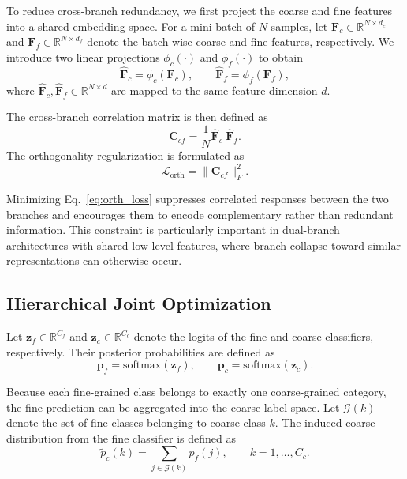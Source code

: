 \documentclass[pdflatex,sn-mathphys-num]{sn-jnl}
\theoremstyle{thmstyleone}%
\theoremstyle{thmstyletwo}%
\theoremstyle{thmstylethree}%
\begin{document}
To reduce cross-branch redundancy, we first project the coarse and fine features into a shared embedding space. 
For a mini-batch of $N$ samples, let $\mathbf{F}_c \in \mathbb{R}^{N \times d_c}$ and $\mathbf{F}_f \in \mathbb{R}^{N \times d_f}$ denote the batch-wise coarse and fine features, respectively. 
We introduce two linear projections $\phi_c(\cdot)$ and $\phi_f(\cdot)$ to obtain
\begin{equation}
\hat{\mathbf{F}}_c = \phi_c(\mathbf{F}_c), \qquad
\hat{\mathbf{F}}_f = \phi_f(\mathbf{F}_f),
\end{equation}
where $\hat{\mathbf{F}}_c, \hat{\mathbf{F}}_f \in \mathbb{R}^{N \times d}$ are mapped to the same feature dimension $d$.

The cross-branch correlation matrix is then defined as
\begin{equation}
\mathbf{C}_{cf} = \frac{1}{N}\hat{\mathbf{F}}_c^\top \hat{\mathbf{F}}_f.
\end{equation}
The orthogonality regularization is formulated as
\begin{equation}
\mathcal{L}_{\text{orth}} = \|\mathbf{C}_{cf}\|_F^2.
\label{eq:orth_loss}
\end{equation}

Minimizing Eq.~\eqref{eq:orth_loss} suppresses correlated responses between the two branches and encourages them to encode complementary rather than redundant information. 
This constraint is particularly important in dual-branch architectures with shared low-level features, where branch collapse toward similar representations can otherwise occur.

\subsection{Hierarchical Joint Optimization}

Let $\mathbf{z}_f \in \mathbb{R}^{C_f}$ and $\mathbf{z}_c \in \mathbb{R}^{C_c}$ denote the logits of the fine and coarse classifiers, respectively. 
Their posterior probabilities are defined as
\begin{equation}
\mathbf{p}_f = \mathrm{softmax}(\mathbf{z}_f), \qquad
\mathbf{p}_c = \mathrm{softmax}(\mathbf{z}_c).
\end{equation}

Because each fine-grained class belongs to exactly one coarse-grained category, the fine prediction can be aggregated into the coarse label space. 
Let $\mathcal{G}(k)$ denote the set of fine classes belonging to coarse class $k$. 
The induced coarse distribution from the fine classifier is defined as
\begin{equation}
\tilde{p}_c(k) = \sum_{j \in \mathcal{G}(k)} p_f(j), \qquad k=1,\dots,C_c.
\label{eq:fine_to_coarse}
\end{equation}
\end{document}

